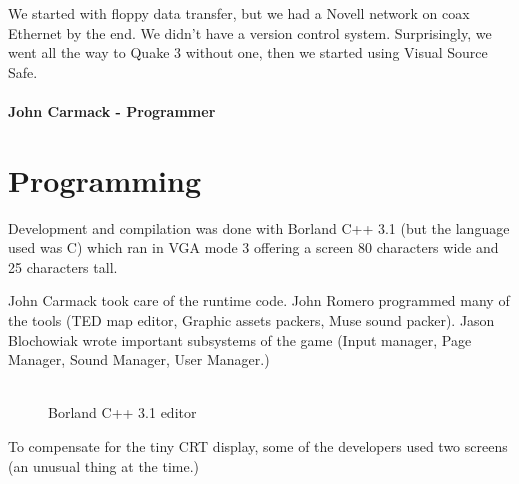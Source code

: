\documentclass[book.tex]{subfiles}
\begin{document}
 \begin{fancyquotes}
We started with floppy data transfer, but we had a Novell network on coax Ethernet by the end. We didn't have a version control system.  Surprisingly, we went all the way to Quake 3 without one, then we started using Visual Source Safe.\\
 \\
\textbf{John Carmack - Programmer}
\end{fancyquotes}


























\section{Programming}



Development and compilation was done with Borland C++ 3.1 (but the language used was C) which ran in VGA mode 3 offering a screen 80 characters wide and 25 characters tall.\\
\par
John Carmack took care of the runtime code. John Romero programmed many of the tools (TED map editor, Graphic assets packers, Muse sound packer). Jason Blochowiak wrote important subsystems of the game (Input manager, Page Manager, Sound Manager, User Manager.)\\
\\
\begin{figure}[H]
\centering
\caption{Borland C++ 3.1 editor}
\end{figure}


To compensate for the tiny CRT display, some of the developers used two screens (an unusual thing at the time.)\\
\end{document}
